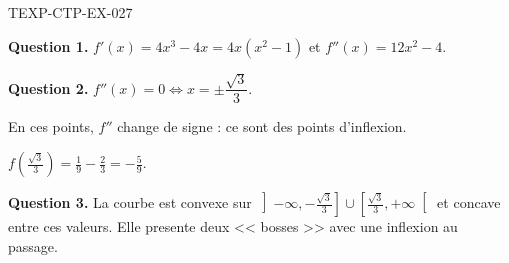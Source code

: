 \begin{corrige}{TEXP-CTP-EX-027}

\textbf{Question 1.} $f'(x) = 4x^3 - 4x = 4x(x^2-1)$ et $f''(x) = 12x^2 - 4$.


\textbf{Question 2.} $f''(x) = 0 \iff x = \pm\dfrac{\sqrt{3}}{3}$.

En ces points, $f''$ change de signe : ce sont des points d'inflexion.

$\displaystyle f\!\left(\frac{\sqrt{3}}{3}\right) = \frac{1}{9} - \frac{2}{3} = -\frac{5}{9}$.

\textbf{Question 3.} La courbe est convexe sur $\left]-\infty, -\frac{\sqrt3}{3}\right] \cup \left[\frac{\sqrt3}{3}, +\infty\right[$ et concave entre ces valeurs. Elle presente deux << bosses >> avec une inflexion au passage.

\end{corrige}
